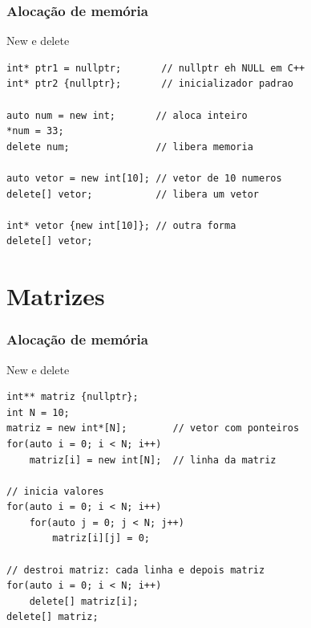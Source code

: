\documentclass[xcolor={usenames,dvipsnames},10pt,compress,aspectratio=169]{beamer}
\begin{document}
\begin{frame}[fragile]
  \frametitle{Alocação de memória}
  \begin{block}{New e delete}
\begin{lstlisting}
int* ptr1 = nullptr;       // nullptr eh NULL em C++
int* ptr2 {nullptr};       // inicializador padrao

auto num = new int;       // aloca inteiro
*num = 33;
delete num;               // libera memoria

auto vetor = new int[10]; // vetor de 10 numeros
delete[] vetor;           // libera um vetor 

int* vetor {new int[10]}; // outra forma
delete[] vetor;
\end{lstlisting}
  \end{block}
\end{frame}
\section{Matrizes}

\begin{frame}[fragile]
  \frametitle{Alocação de memória}
  \begin{block}{New e delete}
\begin{lstlisting}
int** matriz {nullptr};
int N = 10;
matriz = new int*[N];        // vetor com ponteiros
for(auto i = 0; i < N; i++)
    matriz[i] = new int[N];  // linha da matriz

// inicia valores
for(auto i = 0; i < N; i++)
    for(auto j = 0; j < N; j++)
        matriz[i][j] = 0;

// destroi matriz: cada linha e depois matriz
for(auto i = 0; i < N; i++)
    delete[] matriz[i];
delete[] matriz;
\end{lstlisting}
\end{block}
\end{frame}
\end{document}
